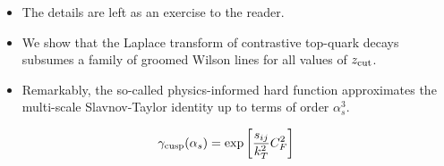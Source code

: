 \begin{itemize}
  \item The details are left as an exercise to the reader.
  \item We show that the Laplace transform of contrastive top-quark decays subsumes a family of groomed Wilson lines for all values of $z_{\rm cut}$.
  \item Remarkably, the so-called physics-informed hard function approximates the multi-scale Slavnov-Taylor identity up to terms of order $\alpha_s^3$.
\end{itemize}

\begin{equation}
  \gamma_{\rm cusp}(\alpha_s) = \exp\left[\frac{s_{ij}}{k_T^2} C_F^2\right]
  \label{eq:7}
\end{equation}

